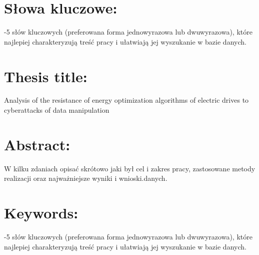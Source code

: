 \documentclass[12pt, a4paper]{report}
\begin{document}
\section*{Słowa kluczowe:} -5 słów kluczowych (preferowana forma jednowyrazowa lub dwuwyrazowa), które najlepiej charakteryzują treść pracy i ułatwiają jej wyszukanie w bazie danych.

\section*{Thesis title:} \noindent Analysis of the resistance of energy optimization algorithms of electric drives
to cyberattacks of data manipulation

\section*{Abstract:} \noindent W kilku zdaniach opisać skrótowo jaki był cel i zakres pracy, zastosowane metody realizacji oraz najważniejsze wyniki i wnioski.danych.

\section*{Keywords:} -5 słów kluczowych (preferowana forma jednowyrazowa lub dwuwyrazowa), które najlepiej charakteryzują treść pracy i ułatwiają jej wyszukanie w bazie danych.


\newpage
\tableofcontents
\newpage







\printbibliography[heading=bibintoc, title={LITERATURA}]


\end{document}
